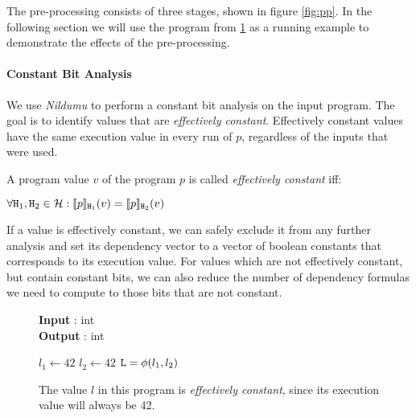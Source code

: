 The pre-processing consists of three stages, shown in figure \ref{fig:pp}. In the following section we will use the program from \ref{fig:ec} as a running example to demonstrate the effects of the pre-processing.

\paragraph{Constant Bit Analysis}
We use \emph{Nildumu} \cite{bechberger18} to perform a constant bit analysis on the input program. The goal is to identify values that are \emph{effectively constant}. Effectively constant values have the same execution value in every run of $p$, regardless of the inputs that were used.

\begin{definition}
    A program value $v$ of the program $p$ is called \emph{effectively constant} iff:
    \begin{center}
        $\forall \mathtt{H}_1, \mathtt{H}_2 \in \mathcal{H}: \llbracket p \rrbracket_{\mathtt{H}_1} (v) = \llbracket p \rrbracket_{\mathtt{H}_2}(v)$
    \end{center}
\end{definition}

If a value is effectively constant, we can safely exclude it from any further analysis and set its dependency vector to a vector of boolean constants that corresponds to its execution value. For values which are not effectively constant, but contain constant bits, we can also reduce the number of dependency formulas we need to compute to those bits that are not constant.

\begin{figure}
    \centering
    \begin{minipage}{.7\linewidth}
        \begin{algorithm}[H]
            \hspace*{\algorithmicindent} \textbf{Input} \In: int \\
            \hspace*{\algorithmicindent} \textbf{Output} \Out: int \\
            \hspace{1em}
            \begin{algorithmic}[1]
                \State $l_1 \leftarrow 42$
                \Else
                \State $l_2 \leftarrow 42$
                \EndIf
                \State $\mathtt{L} = \phi(l_1, l_2)$
            \end{algorithmic}
        \end{algorithm}
    \end{minipage}
    \caption{The value $l$ in this program is \emph{effectively constant}, since its execution value will always be 42.}
    \label{fig:ec}
\end{figure}

